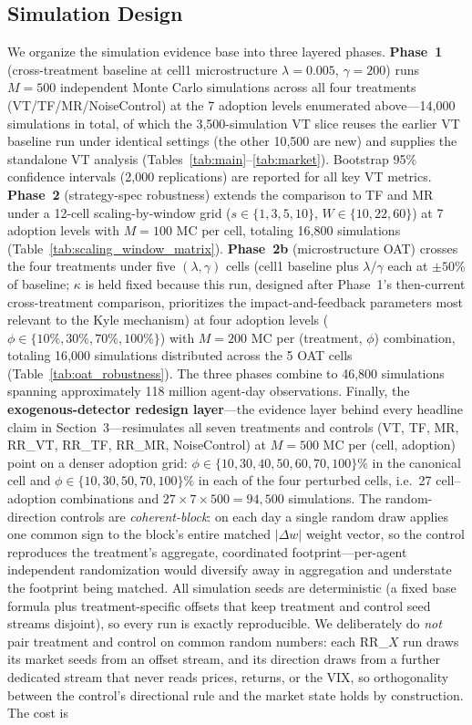\documentclass[12pt,a4paper]{article}
\begin{document}
\subsection{Simulation Design}

We organize the simulation evidence base into three layered phases. \textbf{Phase~1} (cross-treatment baseline at cell1 microstructure $\lambda = 0.005$, $\gamma = 200$) runs $M = 500$ independent Monte Carlo simulations across all four treatments (VT/TF/MR/NoiseControl) at the 7 adoption levels enumerated above---14{,}000 simulations in total, of which the 3{,}500-simulation VT slice reuses the earlier VT baseline run under identical settings (the other 10{,}500 are new) and supplies the standalone VT analysis (Tables~\ref{tab:main}--\ref{tab:market}). Bootstrap 95\% confidence intervals (2{,}000 replications) are reported for all key VT metrics. \textbf{Phase~2} (strategy-spec robustness) extends the comparison to TF and MR under a 12-cell scaling-by-window grid ($s \in \{1, 3, 5, 10\}$, $W \in \{10, 22, 60\}$) at 7 adoption levels with $M = 100$ MC per cell, totaling 16{,}800 simulations (Table~\ref{tab:scaling_window_matrix}). \textbf{Phase~2b} (microstructure OAT) crosses the four treatments under five $(\lambda, \gamma)$ cells (cell1 baseline plus $\lambda$/$\gamma$ each at $\pm 50\%$ of baseline; $\kappa$ is held fixed because this run, designed after Phase~1's then-current cross-treatment comparison, prioritizes the impact-and-feedback parameters most relevant to the Kyle mechanism) at four adoption levels ($\phi \in \{10\%, 30\%, 70\%, 100\%\}$) with $M = 200$ MC per (treatment, $\phi$) combination, totaling 16{,}000 simulations distributed across the 5 OAT cells (Table~\ref{tab:oat_robustness}). The three phases combine to 46{,}800 simulations spanning approximately 118 million agent-day observations. Finally, the \textbf{exogenous-detector redesign layer}---the evidence layer behind every headline claim in Section~3---resimulates all seven treatments and controls (VT, TF, MR, RR\_VT, RR\_TF, RR\_MR, NoiseControl) at $M = 500$ MC per (cell, adoption) point on a denser adoption grid: $\phi \in \{10, 30, 40, 50, 60, 70, 100\}\%$ in the canonical cell and $\phi \in \{10, 30, 50, 70, 100\}\%$ in each of the four perturbed cells, i.e.\ 27 cell--adoption combinations and $27 \times 7 \times 500 = 94{,}500$ simulations. The random-direction controls are \emph{coherent-block}: on each day a single random draw applies one common sign to the block's entire matched $|\Delta w|$ weight vector, so the control reproduces the treatment's aggregate, coordinated footprint---per-agent independent randomization would diversify away in aggregation and understate the footprint being matched. All simulation seeds are deterministic (a fixed base formula plus treatment-specific offsets that keep treatment and control seed streams disjoint), so every run is exactly reproducible. We deliberately do \emph{not} pair treatment and control on common random numbers: each RR\_$X$ run draws its market seeds from an offset stream, and its direction draws from a further dedicated stream that never reads prices, returns, or the VIX, so orthogonality between the control's directional rule and the market state holds by construction. The cost is 
\end{document}

